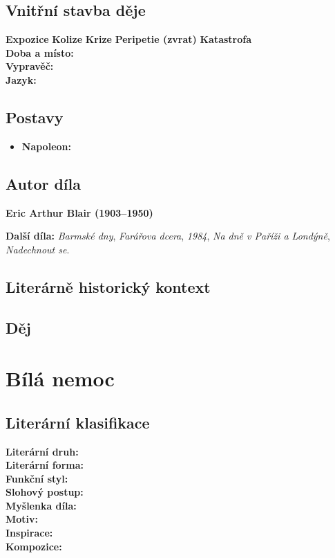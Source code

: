\documentclass[12pt, a4paper]{article}
\newcommand{\mybf}[1]{\textcolor[RGB]{0, 179, 219}{\textbf{#1}}}
\begin{document}
\subsection*{Vnitřní stavba děje}
\noindent\textbf{Expozice} 
\noindent\textbf{Kolize} 
\noindent\textbf{Krize} 
\noindent\textbf{Peripetie (zvrat)} 
\noindent\textbf{Katastrofa} \\[10pt]
\mybf{Doba a místo:} \\[10pt]
\mybf{Vypravěč:} \\[10pt]
\mybf{Jazyk:} 

\subsection*{Postavy}
\begin{itemize}[itemsep=0.3em]
	\item \textbf{Napoleon:}
\end{itemize}

\subsection*{Autor díla}
\textbf{Eric Arthur Blair (1903--1950)}

\textbf{Další díla:} \textit{Barmské dny}, \textit{Farářova dcera}, \textit{1984}, \textit{Na dně v Paříži a Londýně}, \textit{Nadechnout se}.

\subsection*{Literárně historický kontext}

{\color{subsectioncolor}\hrulefill}
\subsection*{\color{subsectioncolor}Děj}

\newpage

\section{Bílá nemoc}

\subsection*{Literární klasifikace}
\mybf{Literární druh:} \\[3pt]
\mybf{Literární forma:} \\[3pt]
\mybf{Funkční styl:} \\[3pt]
\mybf{Slohový postup:} \\[10pt]
\mybf{Myšlenka díla:} \\[10pt]
\mybf{Motiv:} \\[10pt]
\mybf{Inspirace:} \\[10pt]
\mybf{Kompozice:} 
\end{document}
